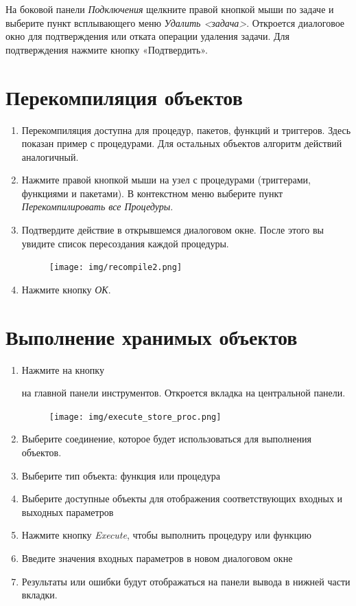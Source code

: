 На боковой панели \textit{Подключения} щелкните правой кнопкой мыши по задаче и выберите пункт всплывающего меню \textit{Удалить <задача>}. Откроется  диалоговое окно для подтверждения или отката операции удаления задачи. Для подтверждения нажмите кнопку «Подтвердить».

\newpage
\section{Перекомпиляция объектов}\label{sec:recompile_objects}
\begin{enumerate}[leftmargin=20pt]
	\item Перекомпиляция доступна для процедур, пакетов, функций и триггеров. Здесь показан пример с процедурами. Для остальных объектов алгоритм действий аналогичный.
	\item Нажмите правой кнопкой мыши на узел с процедурами (триггерами, функциями и пакетами). В контекстном меню выберите пункт \textit{Перекомпилировать все Процедуры}.
	\item Подтвердите действие в открывшемся диалоговом окне. После этого вы увидите список  пересоздания каждой процедуры.
	\begin{figure}[H]
		\centering
		\texttt{[image: img/recompile2.png]}
	\end{figure}
	\item Нажмите кнопку \textit{ОК}. 
\end{enumerate}
\newpage
\section{Выполнение хранимых объектов}\label{sec:execute_proc}

\begin{enumerate}[leftmargin=20pt]
	\item Нажмите на кнопку  на главной панели инструментов. Откроется вкладка на центральной панели.
	\begin{figure}[H]
		\centering
		\texttt{[image: img/execute\_store\_proc.png]}
	\end{figure}
	
	\item Выберите соединение, которое будет использоваться для выполнения объектов.
	\item Выберите тип объекта: функция или процедура
	\item Выберите доступные объекты для отображения соответствующих входных и выходных параметров
	\item Нажмите кнопку \textit{Execute}, чтобы выполнить процедуру или функцию
	\item Введите значения входных параметров в новом диалоговом окне
	\item Результаты или ошибки будут отображаться на панели вывода в нижней части вкладки.
\end{enumerate}

